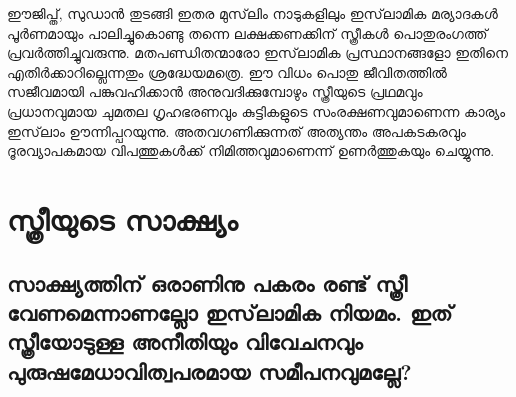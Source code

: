 ഈജിപ്ത്, സുഡാന്‍ തുടങ്ങി ഇതര മുസ്‌ലിം നാടുകളിലും ഇസ്‌ലാമിക മര്യാദകള്‍ പൂര്‍ണമായും പാലിച്ചുകൊണ്ടു തന്നെ ലക്ഷക്കണക്കിന് സ്ത്രീകള്‍ പൊതുരംഗത്ത് പ്രവര്‍ത്തിച്ചുവരുന്നു. മതപണ്ഡിതന്മാരോ ഇസ്‌ലാമിക പ്രസ്ഥാനങ്ങളോ ഇതിനെ എതിര്‍ക്കാറില്ലെന്നതും ശ്രദ്ധേയമത്രെ. ഈ വിധം പൊതു ജീവിതത്തില്‍ സജീവമായി പങ്കുവഹിക്കാന്‍ അനുവദിക്കുമ്പോഴും സ്ത്രീയുടെ പ്രഥമവും പ്രധാനവുമായ ചുമതല ഗൃഹഭരണവും കുട്ടികളുടെ സംരക്ഷണവുമാണെന്ന കാര്യം ഇസ്‌ലാം ഊന്നിപ്പറയുന്നു. അതവഗണിക്കുന്നത് അത്യന്തം അപകടകരവും ദൂരവ്യാപകമായ വിപത്തുകള്‍ക്ക് നിമിത്തവുമാണെന്ന് ഉണര്‍ത്തുകയും ചെയ്യുന്നു.
\chapter{സ്ത്രീയുടെ സാക്ഷ്യം }
 \section{ സാക്ഷ്യത്തിന് ഒരാണിനു പകരം രണ്ട് സ്ത്രീ വേണമെന്നാണല്ലോ ഇസ്‌ലാമിക നിയമം. ഇത് സ്ത്രീയോടുള്ള അനീതിയും വിവേചനവും പുരുഷമേധാവിത്വപരമായ സമീപനവുമല്ലേ?}

